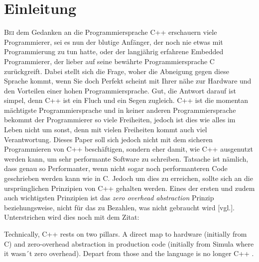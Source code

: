 \section{Einleitung}\label{sec:einleitung}
\lettrine{B}{ei} dem Gedanken an die Programmiersprache C++ erschauern viele Programmierer, sei
es nun der blutige Anfänger, der noch nie etwas mit Programmierung zu tun hatte, oder der
langjährig erfahrene Embedded Programmierer, der lieber auf seine bewährte Programmiersprache C
zurückgreift. Dabei stellt sich die Frage, woher die Abneigung gegen diese Sprache kommt, wenn
Sie doch Perfekt scheint mit Ihrer nähe zur Hardware und den Vorteilen einer hohen
Programmiersprache. Gut, die Antwort darauf ist simpel, denn C++ ist ein Fluch und ein Segen
zugleich. C++ ist die momentan mächtigste Programmiersprache und in keiner anderen
Programmiersprache bekommt der Programmierer so viele Freiheiten, jedoch ist dies wie alles im
Leben nicht um sonst, denn mit vielen Freiheiten kommt auch viel Verantwortung.
\newline
\newline
Dieses Paper soll sich jedoch nicht mit dem sicheren Programmieren von C++ beschäftigen, sondern
eher damit, wie C++ ausgenutzt werden kann, um sehr performante Software zu schreiben. Tatsache
ist nämlich, dass genau so Performanter, wenn nicht sogar noch performanteren Code geschrieben
werden kann wie in C. Jedoch um dies zu erreichen, sollte sich an die ursprünglichen Prinzipien
von C++ gehalten werden. Eines der ersten und zudem auch wichtigsten Prinzipien ist das
\emph{zero overhead abstraction} Prinzip beziehungsweise, nicht für das zu Bezahlen, was nicht
gebraucht wird \cite{HandsOn}[vgl.]. Unterstrichen wird dies noch mit dem Zitat:

\begin{zitat}
    Technically, C++ rests on two pillars. A direct map to hardware (initially from C) and
    zero-overhead abstraction in production code (initially from Simula where it wasn´t zero
    overhead). Depart from those and the language is no longer C++ \cite{ISOC++}.
\end{zitat}


		
		
